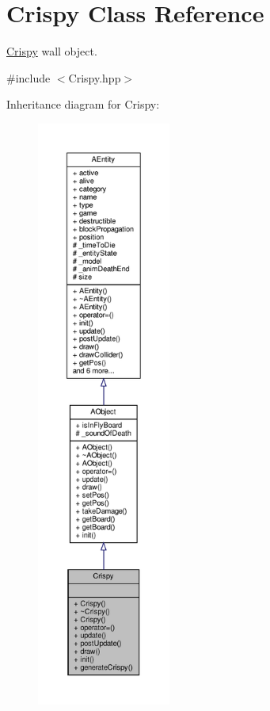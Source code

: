 \hypertarget{class_crispy}{}\section{Crispy Class Reference}
\label{class_crispy}


\hyperlink{class_crispy}{Crispy} wall object.  




{\ttfamily \#include $<$Crispy.\+hpp$>$}



Inheritance diagram for Crispy\+:
\nopagebreak
\begin{figure}[H]
\begin{center}
\leavevmode
\includegraphics[height=550pt]{class_crispy__inherit__graph}
\end{center}
\end{figure}


